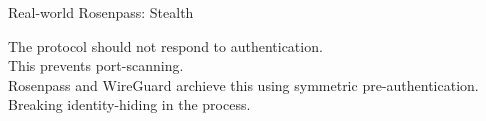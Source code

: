\begin{frame}{Real-world Rosenpass: Stealth}
  \begin{minipage}{.5\pagewidth}
    \centering
    The protocol should not respond to authentication.
    \\[1.3em] This prevents port-scanning.
    \\[1.3em] Rosenpass and WireGuard archieve this using symmetric pre-authentication.
    \\[1.3em] Breaking identity-hiding in the process.
  \end{minipage}
\end{frame}
